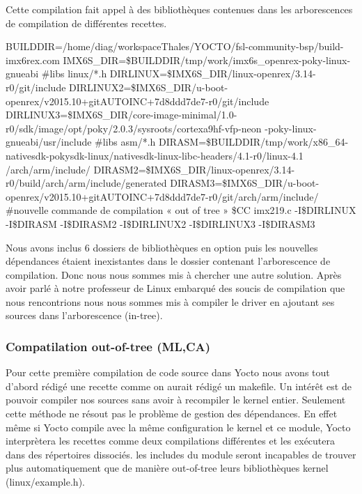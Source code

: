 {Cette compilation fait appel à des bibliothèques contenues dans les arborescences de
compilation de différentes recettes. 

\begin{tcolorbox}
    BUILDDIR=/home/diag/workspaceThales/YOCTO/fsl-community-bsp/build-imx6rex.com
    IMX6S\_DIR=\$BUILDDIR/tmp/work/imx6s\_openrex-poky-linux-gnueabi
    \#libs linux/*.h
    DIRLINUX=\$IMX6S\_DIR/linux-openrex/3.14-r0/git/include
    DIRLINUX2=\$IMX6S\_DIR/u-boot-openrex/v2015.10+gitAUTOINC+7d8ddd7de7-r0/git/include
    DIRLINUX3=\$IMX6S\_DIR/core-image-minimal/1.0-r0/sdk/image/opt/poky/2.0.3/sysroots/cortexa9hf-vfp-neon
    -poky-linux-gnueabi/usr/include
    \#libs asm/*.h
    DIRASM=\$BUILDDIR/tmp/work/x86\_64-nativesdk-pokysdk-linux/nativesdk-linux-libc-headers/4.1-r0/linux-4.1
    /arch/arm/include/
    DIRASM2=\$IMX6S\_DIR/linux-openrex/3.14-r0/build/arch/arm/include/generated
    DIRASM3=\$IMX6S\_DIR/u-boot-openrex/v2015.10+gitAUTOINC+7d8ddd7de7-r0/git/arch/arm/include/
    \#nouvelle commande de compilation « out of tree »
    \$CC imx219.c -I\$DIRLINUX -I\$DIRASM -I\$DIRASM2 -I\$DIRLINUX2 -I\$DIRLINUX3 -I\$DIRASM3
\end{tcolorbox}

Nous avons inclus 6 dossiers de bibliothèques en option puis les nouvelles dépendances
étaient inexistantes dans le dossier contenant l’arborescence de compilation. Donc nous
nous sommes mis à chercher une autre solution. Après avoir parlé à notre professeur de
Linux embarqué des soucis de compilation que nous rencontrions nous nous sommes mis
à compiler le driver en ajoutant ses sources dans l’arborescence (in-tree).

\subsubsection{Compatilation out-of-tree (ML,CA)}

Pour cette première compilation de code source dans Yocto nous avons tout d'abord
rédigé une recette comme on aurait rédigé un makefile. Un intérêt est de pouvoir compiler
nos sources sans avoir à recompiler le kernel entier. Seulement cette méthode ne résout
pas le problème de gestion des dépendances. En effet même si Yocto compile avec la
même configuration le kernel et ce module, Yocto interprètera les recettes comme deux
compilations différentes et les exécutera dans des répertoires dissociés. les includes du
module seront incapables de trouver plus automatiquement que de manière out-of-tree
leurs bibliothèques kernel (linux/example.h).

}
